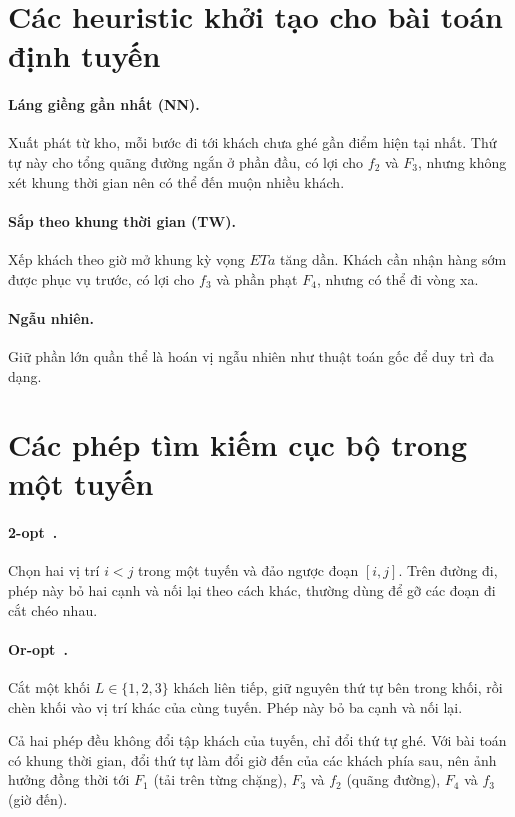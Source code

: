 \section{Các heuristic khởi tạo cho bài toán định tuyến}

\paragraph{Láng giềng gần nhất (NN).} Xuất phát từ kho, mỗi bước đi tới khách chưa ghé gần điểm hiện tại
nhất. Thứ tự này cho tổng quãng đường ngắn ở phần đầu, có lợi cho $f_2$ và $F_3$, nhưng không xét khung
thời gian nên có thể đến muộn nhiều khách.

\paragraph{Sắp theo khung thời gian (TW).} Xếp khách theo giờ mở khung kỳ vọng $ETa$ tăng dần. Khách cần
nhận hàng sớm được phục vụ trước, có lợi cho $f_3$ và phần phạt $F_4$, nhưng có thể đi vòng xa.

\paragraph{Ngẫu nhiên.} Giữ phần lớn quần thể là hoán vị ngẫu nhiên như thuật toán gốc để duy trì đa dạng.

\section{Các phép tìm kiếm cục bộ trong một tuyến}

\paragraph{2-opt~\cite{croes1958}.} Chọn hai vị trí $i<j$ trong một tuyến và đảo ngược đoạn
$[i, j]$. Trên đường đi, phép này bỏ hai cạnh và nối lại theo cách khác, thường dùng để gỡ các đoạn đi
cắt chéo nhau.

\paragraph{Or-opt~\cite{or1976}.} Cắt một khối $L \in \{1,2,3\}$ khách liên tiếp, giữ nguyên thứ tự bên
trong khối, rồi chèn khối vào vị trí khác của cùng tuyến. Phép này bỏ ba cạnh và nối lại.

Cả hai phép đều không đổi tập khách của tuyến, chỉ đổi thứ tự ghé. Với bài toán có khung thời gian, đổi
thứ tự làm đổi giờ đến của các khách phía sau, nên ảnh hưởng đồng thời tới $F_1$ (tải trên từng chặng),
$F_3$ và $f_2$ (quãng đường), $F_4$ và $f_3$ (giờ đến).


